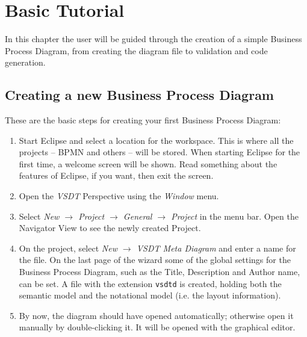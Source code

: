 \chapter{Basic Tutorial}
\label{sec:user_tut}

In this chapter the user will be guided through the creation of a simple Business
Process Diagram, from creating the diagram file to validation and code generation.



\section{Creating a new Business Process Diagram}

These are the basic steps for creating your first Business Process Diagram:

\begin{enumerate}
	
	\item Start Eclipse and select a location for the workspace.  This is where
	all the projects -- BPMN and others -- will be stored.  When starting Eclipse
	for the first time, a welcome screen will be shown.  Read something about the
	features of Eclipse, if you want, then exit the screen.
	
	\item Open the \emph{VSDT} Perspective using the \emph{Window} menu.
	
	\item Select \emph{ New $\rightarrow$ Project $\rightarrow$ General
	$\rightarrow$ Project } in the menu bar.  Open the Navigator View to see the
	newly created Project.
	
	\item On the project, select \emph{New $\rightarrow$ VSDT Meta Diagram} and
	enter a name for the file.  On the last page of the wizard some of the global
	settings for the Business Process Diagram, such as the Title, Description and
	Author name, can be set.  A file with the extension \verb_vsdtd_ is created,
	holding both the semantic model and the notational model (i.e. the layout
	information).
	
	\item By now, the diagram should have opened automatically; otherwise open it
	manually by double-clicking it.  It will be opened with the graphical editor.

\end{enumerate}


